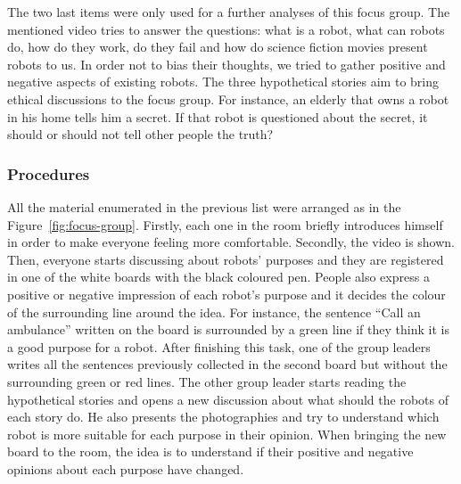The two last items were only used for a further analyses of this focus group.
The mentioned video tries to answer the questions: what is a robot, what can robots do, how do they work, do they fail and how do science fiction movies present robots to us.
In order not to bias their thoughts, we tried to gather positive and negative aspects of existing robots.
The three hypothetical stories aim to bring ethical discussions to the focus group.
For instance, an elderly that owns a robot in his home tells him a secret.
If that robot is questioned about the secret, it should or should not tell other people the truth?

\subsubsection{Procedures}
All the material enumerated in the previous list were arranged as in the Figure~\ref{fig:focus-group}.
Firstly, each one in the room briefly introduces himself in order to make everyone feeling more comfortable.
Secondly, the video is shown.
Then, everyone starts discussing about robots' purposes and they are registered in one of the white boards with the black coloured pen.
People also express a positive or negative impression of each robot's purpose and it decides the colour of the surrounding line around the idea.
For instance, the sentence ``Call an ambulance'' written on the board is surrounded by a green line if they think it is a good purpose for a robot.
After finishing this task, one of the group leaders writes all the sentences previously collected in the second board but without the surrounding green or red lines.
The other group leader starts reading the hypothetical stories and opens a new discussion about what should the robots of each story do.
He also presents the photographies and try to understand which robot is more suitable for each purpose in their opinion.
When bringing the new board to the room, the idea is to understand if their positive and negative opinions about each purpose have changed.

